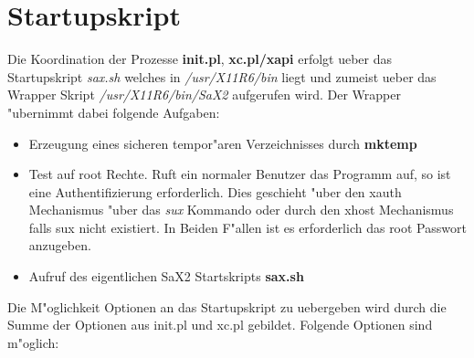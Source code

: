 \section{Startupskript}
\label{sec:sta}
Die Koordination der Prozesse \textbf{init.pl}, \textbf{xc.pl/xapi}
erfolgt ueber das Startupskript \textit{sax.sh} welches in 
\textit{/usr/X11R6/bin} liegt und zumeist ueber das Wrapper 
Skript \textit{/usr/X11R6/bin/SaX2} aufgerufen wird. Der Wrapper 
"ubernimmt dabei folgende Aufgaben:
\begin{itemize}
\item Erzeugung eines sicheren tempor"aren Verzeichnisses durch \textbf{mktemp} 
\item Test auf root Rechte. Ruft ein normaler Benutzer das Programm auf, so
      ist eine Authentifizierung erforderlich. Dies geschieht "uber den 
      xauth Mechanismus "uber das \textit{sux} Kommando oder durch den xhost
      Mechanismus falls sux nicht existiert. In Beiden F"allen ist es 
      erforderlich das root Passwort anzugeben. 
\item Aufruf des eigentlichen SaX2 Startskripts \textbf{sax.sh}
\end{itemize}
Die M"oglichkeit Optionen an das Startupskript zu uebergeben wird 
durch die Summe der Optionen aus init.pl und xc.pl gebildet.
Folgende Optionen sind m"oglich:
